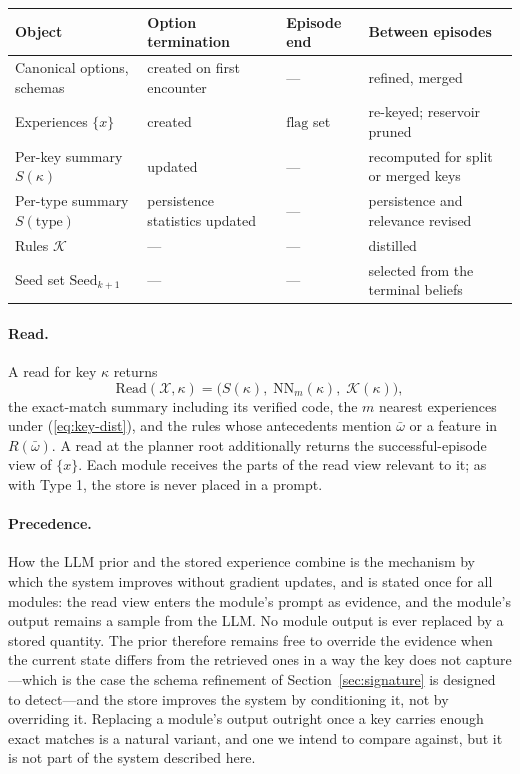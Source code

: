 \documentclass[11pt]{article}
\newcommand{\calK}{\mathcal{K}}
\newcommand{\calX}{\mathcal{X}}
\newcommand{\Rel}{R}
\newcommand{\Read}{\mathrm{Read}}
\newcommand{\type}{\mathrm{type}}
\begin{document}
\begin{center}\small
\begin{tabular}{@{}>{\raggedright\arraybackslash}p{}>{\raggedright\arraybackslash}p{}>{\raggedright\arraybackslash}p{}>{\raggedright\arraybackslash}p{}@{}}
\toprule
Object & Option termination & Episode end & Between episodes \\
\midrule
Canonical options, schemas & created on first encounter & --- & refined, merged \\
Experiences $\{x\}$ & created & $\mathrm{flag}$ set & re-keyed; reservoir pruned \\
Per-key summary $S(\kappa)$ & updated & --- & recomputed for split or merged keys \\
Per-type summary $S(\type)$ & persistence statistics updated & --- & persistence and relevance revised \\
Rules $\calK$ & --- & --- & distilled \\
Seed set $\mathrm{Seed}_{k+1}$ & --- & --- & selected from the terminal beliefs \\
\bottomrule
\end{tabular}
\end{center}

\paragraph{Read.}
A read for key $\kappa$ returns
\begin{equation}
\Read(\calX,\kappa)=\big(S(\kappa),\;\mathrm{NN}_m(\kappa),\;\calK(\kappa)\big),
\label{eq:type2-read}
\end{equation}
the exact-match summary including its verified code, the $m$ nearest experiences under (\ref{eq:key-dist}), and the rules whose antecedents mention $\bar\omega$ or a feature in $\Rel(\bar\omega)$. A read at the planner root additionally returns the successful-episode view of $\{x\}$. Each module receives the parts of the read view relevant to it; as with Type 1, the store is never placed in a prompt.

\paragraph{Precedence.}
How the LLM prior and the stored experience combine is the mechanism by which the system improves without gradient updates, and is stated once for all modules: the read view enters the module's prompt as evidence, and the module's output remains a sample from the LLM. No module output is ever replaced by a stored quantity. The prior therefore remains free to override the evidence when the current state differs from the retrieved ones in a way the key does not capture---which is the case the schema refinement of Section~\ref{sec:signature} is designed to detect---and the store improves the system by conditioning it, not by overriding it. Replacing a module's output outright once a key carries enough exact matches is a natural variant, and one we intend to compare against, but it is not part of the system described here.
\end{document}
